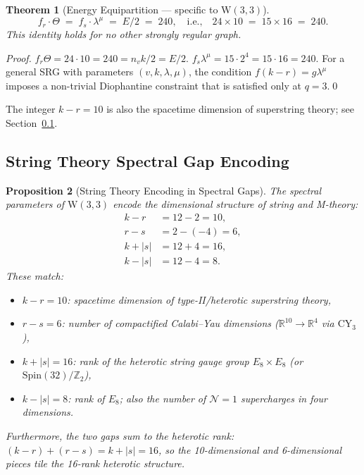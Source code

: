\documentclass[12pt,a4paper]{article}
\newtheorem{theorem}{Theorem}[section]
\newtheorem{proposition}[theorem]{Proposition}
\newcommand{\W}{\mathrm{W}(3,3)}
\newcommand{\nv}{n_{\!v}}
\newcommand{\fr}{f_{\!r}}
\newcommand{\fs}{f_{\!s}}
\begin{document}
\begin{theorem}[Energy Equipartition --- specific to $\W$]
\label{thm:equipartition}
\[
  \boxed{\fr \cdot \Theta \;=\; \fs \cdot \lambda^\mu \;=\; E/2 \;=\; 240,
  \quad\text{i.e.,}\quad 24 \times 10 \;=\; 15 \times 16 \;=\; 240.}
\]
This identity holds for \emph{no other} strongly regular graph.
\end{theorem}

\begin{proof}
$\fr\Theta = 24 \cdot 10 = 240 = \nv k/2 = E/2$.
$\fs\lambda^\mu = 15 \cdot 2^4 = 15 \cdot 16 = 240$.
For a general SRG with parameters $(v,k,\lambda,\mu)$, the condition
$f(k-r) = g\lambda^\mu$ imposes a non-trivial Diophantine constraint
that is satisfied only at $q=3$.\qed
\end{proof}

The integer $k-r = 10$ is also the spacetime dimension of
superstring theory; see Section~\ref{sec:stringgap}.

\subsection{String Theory Spectral Gap Encoding}
\label{sec:stringgap}

\begin{proposition}[String Theory Encoding in Spectral Gaps]
\label{prop:stringgap}
The spectral parameters of $\W$ encode the dimensional structure of
string and M-theory:
\begin{align}
  k - r   &= 12 - 2    = 10,\label{eq:D10}\\
  r - s   &= 2-(-4)    = 6, \label{eq:CY6}\\
  k + |s| &= 12 + 4    = 16,\label{eq:het16}\\
  k - |s| &= 12 - 4    = 8. \label{eq:E8rank}
\end{align}
These match:
\begin{itemize}
  \item $k-r = 10$: spacetime dimension of type-II/heterotic
        superstring theory,
  \item $r-s = 6$: number of compactified Calabi--Yau dimensions
        ($\mathbb{R}^{10} \to \mathbb{R}^4$ via $\text{CY}_3$),
  \item $k+|s| = 16$: rank of the heterotic string gauge group
        $E_8\times E_8$ (or $\text{Spin}(32)/\mathbb{Z}_2$),
  \item $k-|s| = 8$: rank of $E_8$; also the number of $\mathcal{N}=1$
        supercharges in four dimensions.
\end{itemize}
Furthermore, the two gaps sum to the heterotic rank:
$(k-r)+(r-s) = k+|s| = 16$,
so the 10-dimensional and 6-dimensional pieces tile the 16-rank
heterotic structure.
\end{proposition}
\end{document}
